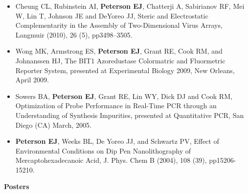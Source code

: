\begin{itemize}
{  EJ}, Grant RE, Roy MA, Reddington MV and Cook RM, BTI1, an
  Azoreductase with pH Dependent Substrate Specificity, Applied
  Environmental Microbiology (2012), under review.
\item
  Cheung CL, Rubinstein AI, \textbf{Peterson EJ}, Chatterji A,
  Sabirianov RF, Mei W, Lin T, Johnson JE and DeYoreo JJ, Steric and
  Electrostatic Complementarity in the Assembly of Two-Dimensional Virus
  Arrays, Langmuir (2010), 26 (5), pp3498--3505.
\item
  Wong MK, Armstrong ES, \textbf{Peterson EJ}, Grant RE, Cook RM, and
  Johnanssen HJ, The BIT1 Azoredustase Colormatric and Fluormetric
  Reporter System, presented at Experimental Biology 2009, New Orleans,
  April 2009.
\item
  Sowers BA, \textbf{Peterson EJ}, Grant RE, Lin WY, Dick DJ and Cook
  RM, Optimization of Probe Performance in Real-Time PCR through an
  Understanding of Synthesis Impurities, presented at Quantitative PCR,
  San Diego (CA) March, 2005.
\item
  \textbf{Peterson EJ}, Weeks BL, De Yoreo JJ, and Schwartz PV, Effect
  of Environmental Conditions on Dip Pen Nanolithography of
  Mercaptohexadecanoic Acid, J. Phys. Chem B (2004), 108 (39),
  pp15206-15210.
\end{itemize}

\textbf{Posters}

